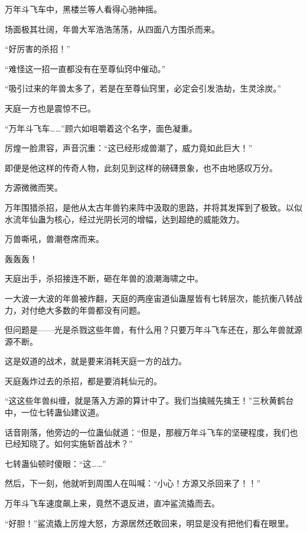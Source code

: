 
\begin{this_body}

万年斗飞车中，黑楼兰等人看得心驰神摇。

场面极其壮阔，年兽大军浩浩荡荡，从四面八方围杀而来。

“好厉害的杀招！”

“难怪这一招一直都没有在至尊仙窍中催动。”

“吸引过来的年兽太多了，若是在至尊仙窍里，必定会引发浩劫，生灵涂炭。”

天庭一方也是震惊不已。

“万年斗飞车……”顾六如咀嚼着这个名字，面色凝重。

厉煌一脸肃容，声音沉重：“这已经形成兽潮了，威力竟如此巨大！”

即便是他这样的传奇人物，此刻见到这样的磅礴景象，也不由地感叹万分。

方源微微而笑。

万年围猎杀招，是他从太古年兽钓来阵中汲取的思路，并将其发挥到了极致。以似水流年仙蛊为核心，经过光阴长河的增幅，达到超绝的威能效力。

万兽嘶吼，兽潮卷席而来。

轰轰轰！

天庭出手，杀招接连不断，砸在年兽的浪潮海啸之中。

一大波一大波的年兽被炸翻，天庭的两座宙道仙蛊屋皆有七转层次，能抗衡八转战力，对付绝大多数的年兽都没有问题。

但问题是——光是杀戮这些年兽，有什么用？只要万年斗飞车还在，那么年兽就源源不断。

这是奴道的战术，就是要来消耗天庭一方的战力。

天庭轰炸过去的杀招，都是要消耗仙元的。

“这这些年兽纠缠，就是落入方源的算计中了。我们当擒贼先擒王！”三秋黄鹤台中，一位七转蛊仙建议道。

话音刚落，他旁边的一位蛊仙就道：“但是，那艘万年斗飞车的坚硬程度，我们也已经知晓了。如何实施斩首战术？”

七转蛊仙顿时傻眼：“这……”

然后，下一刻，他就听到周围人在叫喊：“小心！方源又杀回来了！！”

万年斗飞车速度飙上来，竟然不退反进，直冲鲨流撬而去。

“好胆！”鲨流撬上厉煌大怒，方源居然还敢回来，明显是没有把他们看在眼里。


\end{this_body}
